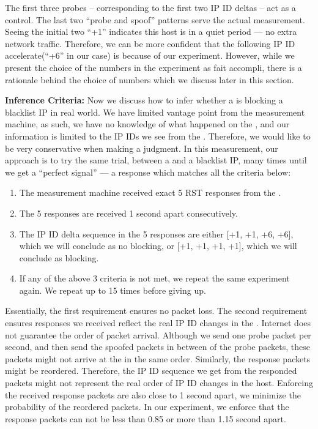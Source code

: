 The first three probes -- corresponding to the first two IP ID deltas -- act as a
control. The last two ``probe and spoof'' patterns serve the actual measurement.
Seeing the initial two ``+1'' indicates this host is in a quiet period --- no
extra network traffic. Therefore, we can be more confident that the following
IP ID accelerate(``+6'' in our case) is because of our experiment. However,
while we present the choice of the numbers in the experiment as fait accompli,
there is a rationale behind the choice of numbers which we discuss later in
this section.

\textbf{Inference Criteria: }
Now we discuss how to infer whether a {} is blocking a blacklist IP
in real world. We have limited vantage point from the measurement machine, as
such, we have no knowledge of what happened on the {}, and our
information is limited to the IP IDs we see from the {}. Therefore,
we would like to be very conservative when making a judgment. In this
measurement, our approach is to try the same trial, between a {} and a
blacklist IP, many times until we get a ``perfect signal'' --- a response
which matches all the criteria below:

\begin{enumerate}
    \item The measurement machine received exact 5 RST responses from the {}.
    \item The 5 responses are received 1 second apart consecutively.
    \item The IP ID delta sequence in the 5 responses are either [+1, +1, +6, +6],
    which we will conclude as no blocking, or [+1, +1, +1, +1], which we will
    conclude as blocking.
    \item If any of the above 3 criteria is not met, we repeat the same experiment again.
    We repeat up to 15 times before giving up.
\end{enumerate}

Essentially, the first requirement ensures no packet loss. The second
requirement ensures responses we received reflect the real IP ID changes in
the {}. Internet does not guarantee the order of packet arrival.
Although we send one probe packet per second, and then send the spoofed
packets in between of the probe packets, these packets might not arrive at
the {} in the same order. Similarly, the response packets might be
reordered. Therefore, the IP ID sequence we get from the responded packets
might not represent the real order of IP ID changes in the host. Enforcing
the received response packets are also close to 1 second apart, we minimize
the probability of the reordered packets. In our experiment, we enforce that
the response packets can not be less than 0.85 or more than 1.15 second
apart.

